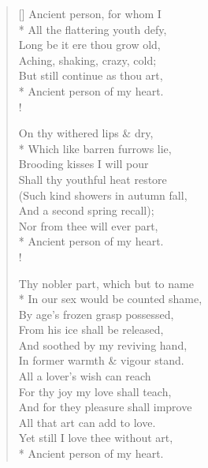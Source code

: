 \documentclass[MAIN]{subfiles}
\begin{document}
\settowidth{\versewidth}{\vin But still continue as thou art,}
\begin{verse}[\versewidth]
Ancient person, for whom I\\*
All the flattering youth defy,\\
Long be it ere thou grow old,\\
Aching, shaking, crazy, cold;\\
\vin But still continue as thou art,\\*
\vin Ancient person of my heart.\\!

On thy withered lips \& dry,\\*
Which like barren furrows lie,\\
Brooding kisses I will pour\\
Shall thy youthful heat restore\\
(Such kind showers in autumn fall,\\
And a second spring recall);\\
\vin Nor from thee will ever part,\\*
\vin Ancient person of my heart.\\!

Thy nobler part, which but to name\\*
In our sex would be counted shame,\\
By age's frozen grasp possessed,\\
From his ice shall be released,\\
And soothed by my reviving hand,\\
In former warmth \& vigour stand.\\
All a lover's wish can reach\\
For thy joy my love shall teach,\\
And for they pleasure shall improve\\
All that art can add to love.\\
\vin Yet still I love thee without art,\\*
\vin Ancient person of my heart.
\end{verse}
\end{document}
